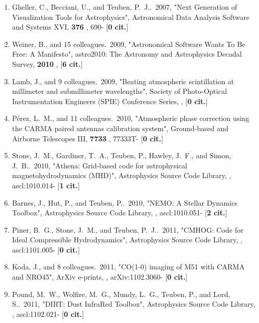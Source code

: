 \documentclass[11pt,letterpaper]{article}
\begin{document}
\begin{enumerate}[resume,label=\textbf{\arabic*}.]
\item  
Gheller, C., Becciani, U., and Teuben, P.~J..\  2007,  "Next Generation of 
Visualization Tools for Astrophysics", Astronomical Data Analysis Software 
and Systems XVI,  {\bf 376} , 690- [{\bf 0 cit.}] 

\item  
Weiner, B., and 15 colleagues.\  2009,  "Astronomical Software Wants To Be 
Free: A Manifesto", astro2010: The Astronomy and Astrophysics Decadal 
Survey,  {\bf 2010} ,  [{\bf 6 cit.}] 

\item  
Lamb, J., and 9 colleagues.\  2009,  "Beating atmospheric scintillation at 
millimeter and submillimeter wavelengths", Society of Photo-Optical 
Instrumentation Engineers (SPIE) Conference Series,  ,  [{\bf 0 cit.}] 

\item  
P{\'e}rez, L.~M., and 11 colleagues.\  2010,  "Atmospheric phase correction 
using the CARMA paired antennas calibration system", Ground-based and 
Airborne Telescopes III,  {\bf 7733} , 77333T- [{\bf 0 cit.}] 

\item  
Stone, J.~M., Gardiner, T.~A., Teuben, P., Hawley, J.~F., and Simon, 
J.~B..\  2010,  "Athena: Grid-based code for astrophysical 
magnetohydrodynamics (MHD)", Astrophysics Source Code Library,  , 
ascl:1010.014- [{\bf 1 cit.}] 

\item  
Barnes, J., Hut, P., and Teuben, P..\  2010,  "NEMO: A Stellar Dynamics 
Toolbox", Astrophysics Source Code Library,  , ascl:1010.051- [{\bf 2 
cit.}] 

\item  
Piner, B.~G., Stone, J.~M., and Teuben, P.~J..\  2011,  "CMHOG: Code for 
Ideal Compressible Hydrodynamics", Astrophysics Source Code Library,  , 
ascl:1101.005- [{\bf 0 cit.}] 

\item  
Koda, J., and 8 colleagues.\  2011,  "CO(1-0) imaging of M51 with CARMA and 
NRO45", ArXiv e-prints,  , arXiv:1102.3060- [{\bf 0 cit.}] 

\item  
Pound, M.~W., Wolfire, M.~G., Mundy, L.~G., Teuben, P., and Lord, S..\  
2011,  "DIRT: Dust InfraRed Toolbox", Astrophysics Source Code Library,  , 
ascl:1102.021- [{\bf 0 cit.}] 


\end{enumerate}
\end{document}
